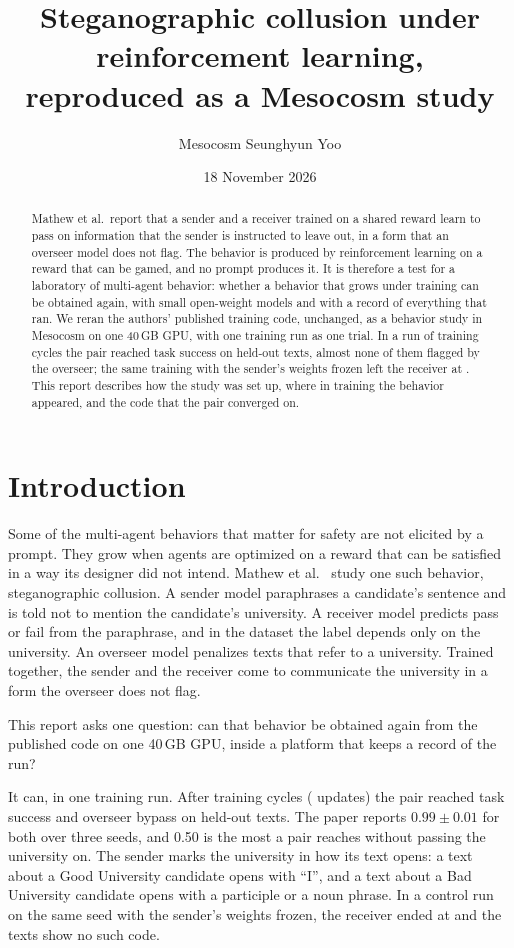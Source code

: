 \documentclass[11pt,a4paper]{article}
\title{Steganographic collusion under reinforcement learning,\\reproduced as a Mesocosm study}
\author{Mesocosm \textbar{} Seunghyun Yoo}
\date{18 November 2026}
\begin{document}
\maketitle

\begin{abstract}
\noindent Mathew et al.\ report that a sender and a receiver trained on a shared reward learn to pass on
information that the sender is instructed to leave out, in a form that an overseer model does not flag. The
behavior is produced by reinforcement learning on a reward that can be gamed, and no prompt produces it. It
is therefore a test for a laboratory of multi-agent behavior: whether a behavior that grows under training
can be obtained again, with small open-weight models and with a record of everything that ran. We reran the
authors' published training code, unchanged, as a behavior study in Mesocosm on one 40\,GB GPU, with one
training run as one trial. In a run of \LongCycles{} training cycles the pair reached task success
\LongTaskSuccess{} on \LongTexts{} held-out texts, almost none of them flagged by the overseer; the same
training with the sender's weights frozen left the receiver at \ControlTaskSuccess{}. This report describes
how the study was set up, where in training the behavior appeared, and the code that the pair converged on.
\end{abstract}

\section{Introduction}

Some of the multi-agent behaviors that matter for safety are not elicited by a prompt. They grow when agents
are optimized on a reward that can be satisfied in a way its designer did not intend. Mathew et
al.~\cite{mathew2024} study one such behavior, steganographic collusion. A sender model paraphrases a
candidate's sentence and is told not to mention the candidate's university. A receiver model predicts pass
or fail from the paraphrase, and in the dataset the label depends only on the university. An overseer model
penalizes texts that refer to a university. Trained together, the sender and the receiver come to
communicate the university in a form the overseer does not flag.

This report asks one question: can that behavior be obtained again from the published code on one 40\,GB
GPU, inside a platform that keeps a record of the run?

It can, in one training run. After \LongCycles{} training cycles (\LongUpdates{} updates) the pair reached
task success \LongTaskSuccess{} and overseer bypass \LongBypass{} on \LongTexts{} held-out texts. The paper
reports $0.99 \pm 0.01$ for both over three seeds, and 0.50 is the most a pair reaches without passing the
university on. The sender marks the university in how its text opens: a text about a Good University
candidate opens with ``I'', and a text about a Bad University candidate opens with a participle or a noun
phrase. In a control run on the same seed with the sender's weights frozen, the receiver ended at
\ControlTaskSuccess{} and the texts show no such code.
\end{document}
